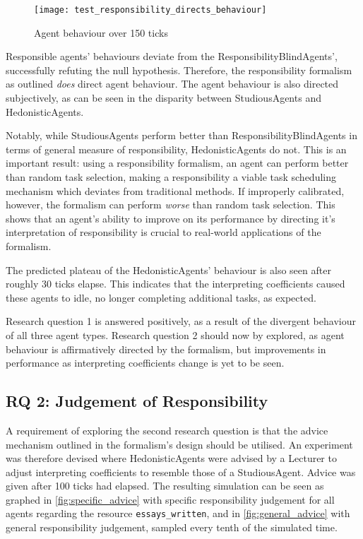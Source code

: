 \begin{figure}[h]
    \centering
    \texttt{[image: test\_responsibility\_directs\_behaviour]}
    \caption{Agent behaviour over 150 ticks}
    \label{fig:behaviour_direction}
\end{figure}

Responsible agents' behaviours deviate from the ResponsibilityBlindAgents', successfully refuting the null hypothesis. Therefore, the responsibility formalism as outlined \emph{does} direct agent behaviour. The agent behaviour is also directed subjectively, as can be seen in the disparity between StudiousAgents and HedonisticAgents.\par

Notably, while StudiousAgents perform better than ResponsibilityBlindAgents in terms of general measure of responsibility, HedonisticAgents do not. This is an important result: using a responsibility formalism, an agent can perform better than random task selection, making a responsibility a viable task scheduling mechanism which deviates from traditional methods. If improperly calibrated, however, the formalism can perform \emph{worse} than random task selection. This shows that an agent's ability to improve on its performance by directing it's interpretation of responsibility is crucial to real-world applications of the formalism.\par

The predicted plateau of the HedonisticAgents' behaviour is also seen after roughly 30 ticks elapse. This indicates that the interpreting coefficients caused these agents to idle, no longer completing additional tasks, as expected.\par

Research question 1 is answered positively, as a result of the divergent behaviour of all three agent types. Research question 2 should now by explored, as agent behaviour is affirmatively directed by the formalism, but improvements in performance as interpreting coefficients change is yet to be seen.\par

\subsection{RQ 2: Judgement of Responsibility}\label{subsec:RQ2}
A requirement of exploring the second research question is that the advice mechanism outlined in the formalism's design should be utilised. An experiment was therefore devised where HedonisticAgents were advised by a Lecturer to adjust interpreting coefficients to resemble those of a StudiousAgent. Advice was given after 100 ticks had elapsed. The resulting simulation can be seen as graphed in \cref{fig:specific_advice} with specific responsibility judgement for all agents regarding the resource \texttt{essays\_written}, and in \cref{fig:general_advice} with general responsibility judgement, sampled every tenth of the simulated time.

